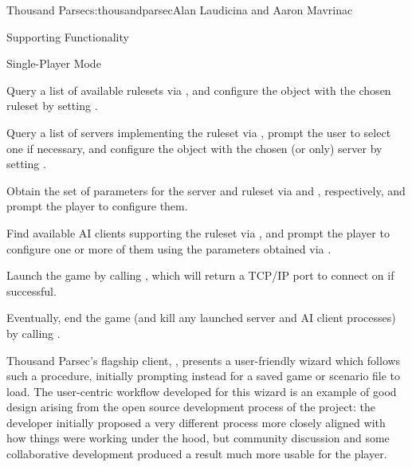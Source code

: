 \begin{aosachapter}{Thousand Parsec}{s:thousandparsec}{Alan Laudicina and Aaron Mavrinac}
\begin{aosasect1}{Supporting Functionality}
\begin{aosasect2}{Single-Player Mode}
\begin{aosaenumerate}
  \item Query a list of available rulesets via
  , and configure the object with
  the chosen ruleset by setting .

  \item Query a list of servers implementing the ruleset via
  , prompt the
  user to select one if necessary, and configure the object with the
  chosen (or only) server by setting .

  \item Obtain the set of parameters for the server and ruleset via
   and
  , respectively, and prompt
  the player to configure them.

  \item Find available AI clients supporting the ruleset
  via , and
  prompt the player to configure one or more of them using the
  parameters obtained via .

  \item Launch the game by calling ,
  which will return a TCP/IP port to connect on if successful.

  \item Eventually, end the game (and kill any launched server and AI
  client processes) by calling .

\end{aosaenumerate}

Thousand Parsec's flagship client, , presents a
user-friendly wizard which follows such a procedure, initially
prompting instead for a saved game or scenario file to load. The
user-centric workflow developed for this wizard is an example of good
design arising from the open source development process of the
project: the developer initially proposed a very different process
more closely aligned with how things were working under the hood, but
community discussion and some collaborative development produced a
result much more usable for the player.


\end{aosasect2}
\end{aosasect1}
\end{aosachapter}
